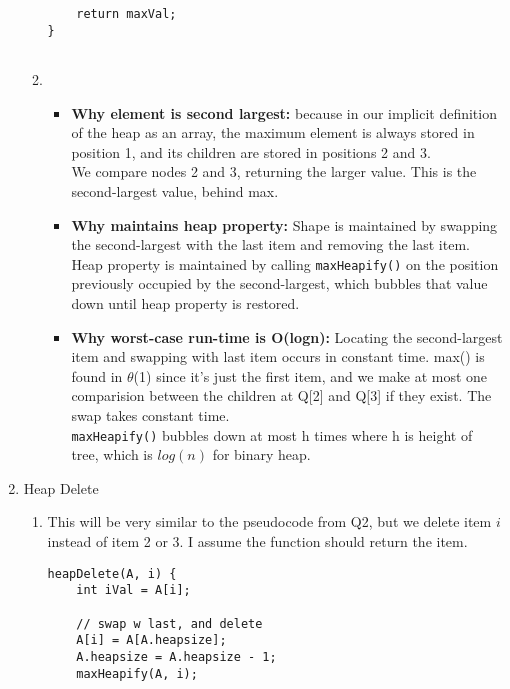 \documentclass{article}
\begin{document}
\begin{enumerate}
\begin{enumerate}
\begin{lstlisting}
	return maxVal;
}
    		
    	\end{lstlisting}
    	
    	\item 
    	\begin{itemize}
    		\item \textbf{Why element is second largest:} because in our implicit definition of the heap as an array, the maximum element is always stored in position 1, and its children are stored in positions 2 and 3. \\
    		
    		We compare nodes 2 and 3, returning the larger value. This is the second-largest value, behind max. \\
    		\item \textbf{Why maintains heap property:} Shape is maintained by swapping the second-largest with the last item and removing the last item. Heap property is maintained by calling \texttt{maxHeapify()} on the position previously occupied by the second-largest, which bubbles that value down until heap property is restored. \\
    		\item \textbf{Why worst-case run-time is O(logn):} Locating the second-largest item and swapping with last item occurs in constant time. max() is found in $\theta$(1) since it's just the first item, and we make at most one comparision between the children at Q[2] and Q[3] if they exist. The swap takes constant time. \\
    		
    		 \texttt{maxHeapify()} bubbles down at most h times where h is height of tree, which is $log(n)$ for binary heap. \\
    	\end{itemize}
    	
	\end{enumerate}
	
	\item Heap Delete
	
	\begin{enumerate}
		\item This will be very similar to the pseudocode from Q2, but we delete item $i$ instead of item 2 or 3. I assume the function should return the item.
		\begin{lstlisting}
heapDelete(A, i) {	
	int iVal = A[i];	
	
	// swap w last, and delete	
	A[i] = A[A.heapsize];
	A.heapsize = A.heapsize - 1;
	maxHeapify(A, i);
	

\end{lstlisting}
\end{enumerate}
\end{enumerate}
\end{document}
